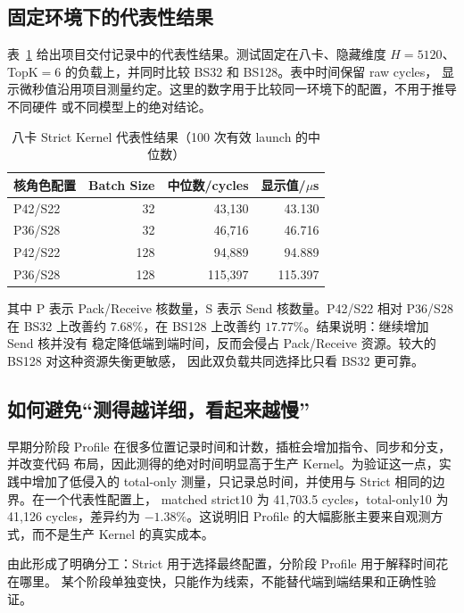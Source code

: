 \documentclass[UTF8,a4paper,11pt]{ctexart}
\begin{document}
\subsection{固定环境下的代表性结果}

表~\ref{tab:performance} 给出项目交付记录中的代表性结果。测试固定在八卡、隐藏维度
$H=5120$、TopK$=6$ 的负载上，并同时比较 BS32 和 BS128。表中时间保留 raw cycles，
显示微秒值沿用项目测量约定。这里的数字用于比较同一环境下的配置，不用于推导不同硬件
或不同模型上的绝对结论。

\begin{table}[htbp]
  \centering
  \caption{八卡 Strict Kernel 代表性结果（100 次有效 launch 的中位数）}
  \label{tab:performance}
  \begin{tabular}{lrrr}
    \toprule
    核角色配置 & Batch Size & 中位数/cycles & 显示值/$\mu$s \\
    \midrule
    P42/S22 & 32  & 43,130  & 43.130 \\
    P36/S28 & 32  & 46,716  & 46.716 \\
    P42/S22 & 128 & 94,889  & 94.889 \\
    P36/S28 & 128 & 115,397 & 115.397 \\
    \bottomrule
  \end{tabular}
\end{table}

其中 P 表示 Pack/Receive 核数量，S 表示 Send 核数量。P42/S22 相对 P36/S28 在 BS32
上改善约 $7.68\%$，在 BS128 上改善约 $17.77\%$。结果说明：继续增加 Send 核并没有
稳定降低端到端时间，反而会侵占 Pack/Receive 资源。较大的 BS128 对这种资源失衡更敏感，
因此双负载共同选择比只看 BS32 更可靠。

\subsection{如何避免“测得越详细，看起来越慢”}

早期分阶段 Profile 在很多位置记录时间和计数，插桩会增加指令、同步和分支，并改变代码
布局，因此测得的绝对时间明显高于生产 Kernel。为验证这一点，实践中增加了低侵入的
total-only 测量，只记录总时间，并使用与 Strict 相同的边界。在一个代表性配置上，
matched strict10 为 41,703.5 cycles，total-only10 为 41,126 cycles，差异约为
$-1.38\%$。这说明旧 Profile 的大幅膨胀主要来自观测方式，而不是生产 Kernel 的真实成本。

由此形成了明确分工：Strict 用于选择最终配置，分阶段 Profile 用于解释时间花在哪里。
某个阶段单独变快，只能作为线索，不能替代端到端结果和正确性验证。
\end{document}
